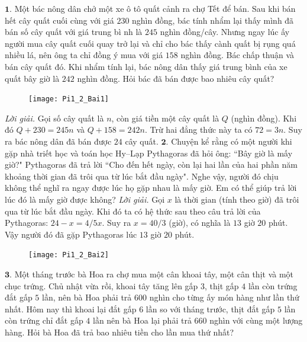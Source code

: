 \begin{multicols}{2}
	$\pmb{1.}$ Một bác nông dân chở một xe ô tô quất cảnh ra chợ Tết để bán. Sau khi bán hết cây quất cuối cùng với giá $230$ nghìn đồng, bác tính nhẩm lại thấy mình đã bán số cây quất với giá trung bì nh là $245$ nghìn đồng/cây. Nhưng ngay lúc ấy người mua cây quất cuối quay trở lại và chỉ cho bác thấy cành quất bị rụng quá nhiều lá, nên ông ta chỉ đồng ý mua với giá $158$ nghìn đồng. 
	Bác chấp thuận và bán cây quất đó. Khi nhẩm tính lại, bác nông dân thấy giá trung bình của xe quất bây giờ là $242$ nghìn đồng. Hỏi bác đã bán được bao nhiêu cây quất?
	\begin{figure}[H]
		\centering
		\vspace*{-10pt}
		\captionsetup{labelformat= empty, justification=centering}
		\texttt{[image: Pi1\_2\_Bai1]}
		\vspace*{-15pt}
	\end{figure}
	\textit{Lời giải.} Gọi số cây quất là $n$, còn giá tiền một cây quất là $Q$ (nghìn đồng). Khi đó $Q+230 = 245n$ và $Q+ 158 = 242n$. Trừ hai đẳng thức này ta có $72 = 3n$. Suy ra bác nông dân đã bán được $24$ cây quất.
	\vskip 0.1cm
	$\pmb{2.}$ Chuyện kể rằng có một người khi gặp nhà triết học và toán học Hy--Lạp Pythagoras đã hỏi ông: ``Bây giờ là mấy giờ?" Pythagoras đã trả lời ``Cho đến hết ngày, còn lại hai lần của hai phần năm khoảng thời gian đã trôi qua từ lúc bắt đầu ngày". Nghe vậy, người đó chịu không thể nghĩ ra ngay được lúc họ gặp nhau là mấy giờ. Em có thể giúp trả lời lúc đó là mấy giờ được không?
	\vskip 0.1cm
	\textit{Lời giải.} 	Gọi $x$ là thời gian (tính theo giờ) đã trôi qua từ lúc bắt đầu ngày. Khi đó ta có hệ thức sau theo câu trả lời của Pythagoras: $24 - x = 4/5 x$. Suy ra $x = 40/3$ (giờ), có nghĩa là $13$ giờ $20$ phút. Vậy người đó đã gặp Pythagoras lúc $13$ giờ $20$ phút.
	\begin{figure}[H]
		\centering
		\vspace*{-10pt}
		\captionsetup{labelformat= empty, justification=centering}
		\texttt{[image: Pi1\_2\_Bai2]}
		\vspace*{-10pt}
	\end{figure}
	$\pmb{3.}$ Một tháng trước bà Hoa ra chợ mua một cân khoai tây, một cân thịt và một chục trứng. Chủ nhật vừa rồi, khoai tây tăng lên gấp $3$, thịt gấp $4$ lần còn trứng đắt gấp $5$ lần, nên bà Hoa phải trả $600$ nghìn cho từng ấy món hàng như lần thứ nhất. Hôm nay thì khoai lại đắt gấp $6$ lần so với tháng trước, thịt đắt gấp $5$ lần còn trứng chỉ đắt gấp $4$ lần nên bà Hoa lại phải trả $660$ nghìn với cùng một lượng hàng. Hỏi bà Hoa đã trả bao nhiêu tiền cho lần mua thứ nhất?

\end{multicols}

